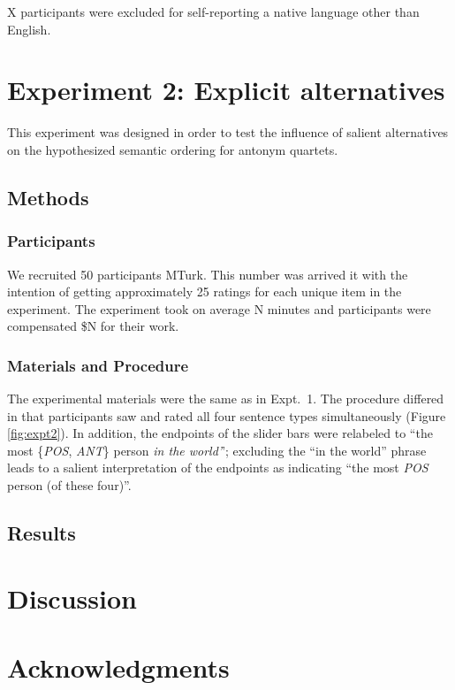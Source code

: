 \documentclass[10pt,letterpaper]{article}
\newcommand{\figref}[1]{Figure \ref{#1}}
\begin{document}
X participants were excluded for self-reporting a native language other than English. 


\section{Experiment 2: Explicit alternatives}
This experiment was designed in order to test the influence of salient alternatives on the hypothesized semantic ordering for antonym quartets.

\subsection{Methods}

\subsubsection{Participants}

We recruited 50 participants MTurk.
This number was arrived it with the intention of getting approximately 25 ratings for each unique item in the experiment.
The experiment took on average N minutes and participants were compensated \$N for their work.


\subsubsection{Materials and Procedure}
The experimental materials were the same as in Expt.~1. 
The procedure differed in that participants saw and rated all four sentence types simultaneously (\figref{fig:expt2}). 
In addition, the endpoints of the slider bars were relabeled to ``the most \{\emph{POS}, \emph{ANT}\} person \emph{in the world'}'; excluding the ``in the world'' phrase leads to a salient interpretation of the endpoints as indicating ``the most \emph{POS} person (of these four)''.

\subsection{Results}

\section{Discussion}

\section{Acknowledgments}




\setlength{\bibleftmargin}{.125in}
\setlength{\bibindent}{-\bibleftmargin}


\end{document}
